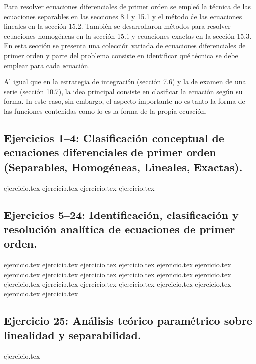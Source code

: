 
Para resolver ecuaciones diferenciales de primer orden se empleó la técnica de las ecuaciones separables en las secciones 8.1 y 15.1 y el método de las ecuaciones lineales en la sección 15.2. También se desarrollaron métodos para resolver ecuaciones homogéneas en la sección 15.1 y ecuaciones exactas en la sección 15.3. En esta sección se presenta una colección variada de ecuaciones diferenciales de primer orden y parte del problema consiste en identificar qué técnica se debe emplear para cada ecuación.

Al igual que en la estrategia de integración (sección 7.6) y la de examen de una serie (sección 10.7), la idea principal consiste en clasificar la ecuación según su forma. In este caso, sin embargo, el aspecto importante no es tanto la forma de las funciones contenidas como lo es la forma de la propia ecuación.

\subsection*{Ejercicios 1--4: Clasificación conceptual de ecuaciones diferenciales de primer orden (Separables, Homogéneas, Lineales, Exactas).}
\begin{enumerate}
    {ejercicio.tex}
    {ejercicio.tex}
    {ejercicio.tex}
    {ejercicio.tex}
\end{enumerate}

\subsection*{Ejercicios 5--24: Identificación, clasificación y resolución analítica de ecuaciones de primer orden.}
\begin{enumerate}
    \setcounter{enumi}{4}
    {ejercicio.tex}
    {ejercicio.tex}
    {ejercicio.tex}
    {ejercicio.tex}
    {ejercicio.tex}
    {ejercicio.tex}
    {ejercicio.tex}
    {ejercicio.tex}
    {ejercicio.tex}
    {ejercicio.tex}
    {ejercicio.tex}
    {ejercicio.tex}
    {ejercicio.tex}
    {ejercicio.tex}
    {ejercicio.tex}
    {ejercicio.tex}
    {ejercicio.tex}
    {ejercicio.tex}
    {ejercicio.tex}
    {ejercicio.tex}
\end{enumerate}

\subsection*{Ejercicio 25: Análisis teórico paramétrico sobre linealidad y separabilidad.}
\begin{enumerate}
    \setcounter{enumi}{24}
    {ejercicio.tex}
\end{enumerate}
